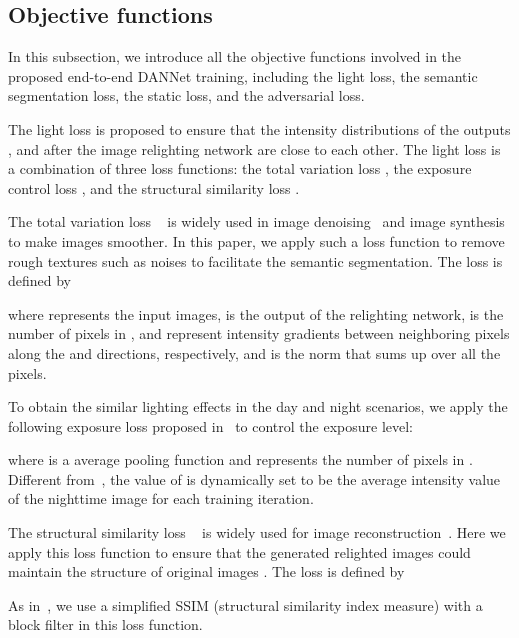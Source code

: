 \documentclass[final]{cvpr}
\begin{document}
\subsection{Objective functions}
In this subsection, we introduce all the objective functions involved in the proposed end-to-end DANNet training, including the light loss, the semantic segmentation loss, the static loss, and the adversarial loss.

\vspace{0.1cm}
\hspace{0.2cm}
The light loss is proposed to ensure that the intensity distributions of the outputs ,  and  after the image relighting network are close to each other. 
The light loss is a combination of three loss functions: the total variation loss , the exposure control loss , and the structural similarity loss .

The total variation loss ~\cite{rudin1992nonlinear} is widely used in image denoising~\cite{zhang2017beyond} and image synthesis~\cite{wang2018high} to make images smoother. 
In this paper, we apply such a loss function to remove rough textures such as noises to facilitate the semantic segmentation. The loss  is defined by

where  represents the input images,  is the output of the relighting network,  is the number of pixels in ,  and  represent intensity gradients between neighboring pixels along the  and  directions, respectively, and  is the  norm that sums up over all the pixels. 

To obtain the similar lighting effects in the day and night scenarios, we apply the following exposure loss  proposed in~\cite{Zero-DCE} to control the exposure level:

where  is a  average pooling function and  represents the number of pixels in . 
Different from~\cite{Zero-DCE}, the value of  is dynamically set to be the average intensity value of the nighttime image for each training iteration. 

The structural similarity loss ~\cite{wang2004image} is widely used for image reconstruction~\cite{godard2017unsupervised,chen2018learning}.
Here we apply this loss function to ensure that the generated relighted images  could maintain the structure of original images . The loss  is defined by

As in~\cite{godard2017unsupervised}, we use a simplified SSIM (structural similarity index measure)  with a  block filter in this loss function.
\end{document}
